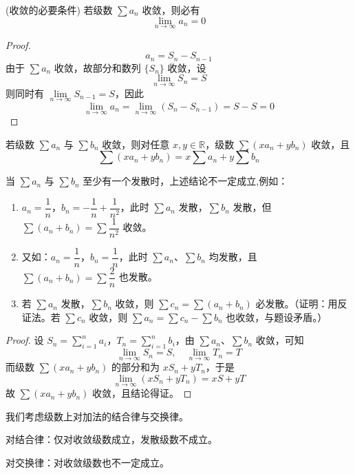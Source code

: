 \begin{proposition}(收敛的必要条件)
	若级数 $\sum a_n$ 收敛，则必有
	\[
	\lim_{n \to \infty} a_n = 0
	\]
	
\end{proposition}
\begin{proof}
	\[
	a_n = S_n - S_{n-1}
	\]
	由于 $\sum a_n$ 收敛，故部分和数列 $\{S_n\}$ 收敛，设
	\[
	\lim_{n \to \infty} S_n = S
	\]
	则同时有 $\lim\limits_{n \to \infty} S_{n-1} = S$，因此
	\[
	\lim_{n \to \infty} a_n = \lim_{n \to \infty} (S_n - S_{n-1}) = S - S = 0
	\]
\end{proof}
\begin{proposition}
	若级数 $\sum a_n$ 与 $\sum b_n$ 收敛，则对任意 $x,y \in \mathbb{R}$，级数 $\sum (x a_n + y b_n)$ 收敛，且
	\[
	\sum (x a_n + y b_n) = x \sum a_n + y \sum b_n
	\]
	
\end{proposition}

当 $\sum a_n$ 与 $\sum b_n$ 至少有一个发散时，上述结论不一定成立,例如：
 \begin{enumerate}
 	\item $a_n = \dfrac{1}{n}$，$b_n = -\dfrac{1}{n} + \dfrac{1}{n^2}$，此时 $\sum a_n$ 发散，$\sum b_n$ 发散，但 $\sum (a_n + b_n) = \sum \dfrac{1}{n^2}$ 收敛。
 	\item 又如：$a_n = \dfrac{1}{n}$，$b_n = \dfrac{1}{n}$，此时 $\sum a_n$、$\sum b_n$ 均发散，且 $\sum (a_n + b_n) = \sum \dfrac{2}{n}$ 也发散。
 	\item 若 $\sum a_n$ 发散，$\sum b_n$ 收敛，则 $\sum c_n = \sum (a_n + b_n)$ 必发散。（证明：用反证法。若 $\sum c_n$ 收敛，则 $\sum a_n = \sum c_n - \sum b_n$ 也收敛，与题设矛盾。）
 \end{enumerate}
\begin{proof}
	设 $S_n = \sum_{i=1}^{n} a_i$，$T_n = \sum_{i=1}^{n} b_i$，由 $\sum a_n$、$\sum b_n$ 收敛，可知
	\[
	\lim_{n \to \infty} S_n = S, \quad \lim_{n \to \infty} T_n = T
	\]
	而级数 $\sum (x a_n + y b_n)$ 的部分和为 $x S_n + y T_n$，于是
	\[
	\lim_{n \to \infty} (x S_n + y T_n) = xS + yT
	\]
	故 $\sum (x a_n + y b_n)$ 收敛，且结论得证。
\end{proof}


我们考虑级数上对加法的结合律与交换律。

对结合律：仅对收敛级数成立，发散级数不成立。

对交换律：对收敛级数也不一定成立。

